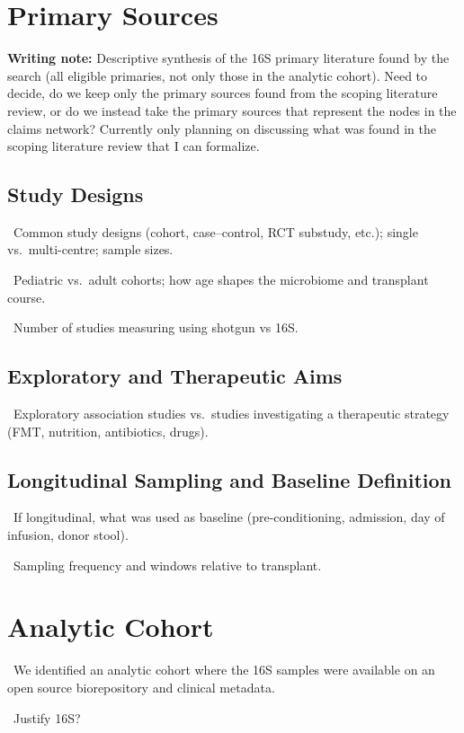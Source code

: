 \documentclass[11pt,a4paper]{article}
\newcommand{\todoitem}[1]{\par\noindent\textcolor{blue!70!black}{\textbullet~#1}}
\newcommand{\writingnote}[1]{\par\medskip\noindent\colorbox{yellow!30}{\parbox{\dimexpr\linewidth-2\fboxsep}{%
  \small\textbf{Writing note:} #1}}\par\medskip}
\begin{document}
\section{Primary Sources}
\label{sec:primary}
\writingnote{Descriptive synthesis of the 16S primary literature found by the search (all eligible primaries, not only those in the analytic cohort). Need to decide, do we keep only the primary sources found from the scoping literature review, or do we instead take the primary sources that represent the nodes in the claims network? Currently only planning on discussing what was found in the scoping literature review that I can formalize.}

\subsection{Study Designs}
\label{sec:primary-design}
\todoitem{Common study designs (cohort, case--control, RCT substudy, etc.); single vs.\ multi-centre; sample sizes.}
\todoitem{Pediatric vs.\ adult cohorts; how age shapes the microbiome and transplant course.}
\todoitem{Number of studies measuring using shotgun vs 16S.}

\subsection{Exploratory and Therapeutic Aims}
\label{sec:primary-aim}
\todoitem{Exploratory association studies vs.\ studies investigating a therapeutic strategy (FMT, nutrition, antibiotics, drugs).}

\subsection{Longitudinal Sampling and Baseline Definition}
\label{sec:primary-baseline}
\todoitem{If longitudinal, what was used as baseline (pre-conditioning, admission, day of infusion, donor stool).}
\todoitem{Sampling frequency and windows relative to transplant.}


\section{Analytic Cohort}
\label{sec:cohort}
\todoitem{We identified an analytic cohort where the 16S samples were available on an open source biorepository and clinical metadata.} 
\todoitem{Justify 16S?}
\end{document}
